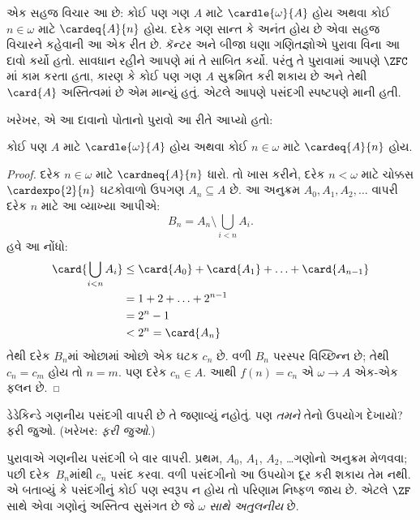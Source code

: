 \begin{ex}
એક સહજ વિચાર આ છે: કોઈ પણ ગણ $A$
માટે $\cardle{\omega}{A}$ હોય અથવા
કોઈ $n \in \omega$ માટે
$\cardeq{A}{n}$ હોય. દરેક ગણ સાન્ત કે
અનંત હોય છે એવા સહજ વિચારને કહેવાની
આ એક રીત છે. કૅન્ટર અને બીજા ઘણા
ગણિતજ્ઞોએ પુરાવા વિના આ દાવો કર્યો હતો.
સાવધાન રહીને આપણે
માં
તે સાબિત કર્યો. પરંતુ તે પુરાવામાં આપણે
$\ZFC$માં કામ કરતા હતા, કારણ કે કોઈ
પણ ગણ $A$ સુક્રમિત કરી શકાય છે અને
તેથી $\card{A}$ અસ્તિત્વમાં છે એમ માન્યું
હતું. એટલે આપણે પસંદગી સ્પષ્ટપણે માની હતી.

ખરેખર, \citet{Dedekind1888}એ આ દાવાનો
પોતાનો પુરાવો આ રીતે આપ્યો હતો:

\begin{thm}
કોઈ પણ $A$ માટે $\cardle{\omega}{A}$ હોય
અથવા કોઈ $n \in \omega$ માટે
$\cardeq{A}{n}$ હોય.
\end{thm}

\begin{proof}
દરેક $n \in \omega$ માટે
$\cardneq{A}{n}$ ધારો. તો ખાસ કરીને,
દરેક $n < \omega$ માટે ચોક્કસ
$\cardexpo{2}{n}$ ઘટકોવાળો ઉપગણ
$A_n \subseteq A$ છે. આ અનુક્રમ
$A_0, A_1, A_2, \ldots$ વાપરી દરેક
$n$ માટે આ વ્યાખ્યા આપીએ:
\[
	B_n = A_n \setminus \bigcup_{i < n} A_i.
\]
હવે આ નોંધો:
\begin{align*}
	\card{\bigcup_{i < n}A_i} 
	&\leq \card{A_0} + \card{A_1} + \ldots + \card{A_{n-1}}\\
	&=1 + 2 + \ldots + 2^{n-1}\\
	& = 2^n - 1\\
	& < 2^n = \card{A_n}
\end{align*}
તેથી દરેક $B_n$માં ઓછામાં ઓછો એક
ઘટક $c_n$ છે. વળી $B_n$ પરસ્પર
વિચ્છિન્ન છે; તેથી $c_n = c_m$ હોય
તો $n = m$. પણ દરેક $c_n \in A$.
આથી $f(n) = c_n$ એ
$\omega \to A$ એક-એક ફલન છે.
\end{proof}
\noindent
ડેડેકિન્ડે ગણનીય પસંદગી વાપરી છે તે
જણાવ્યું નહોતું. પણ \emph{તમને} તેનો
ઉપયોગ દેખાયો? ફરી જુઓ. (ખરેખર:
\emph{ફરી જુઓ}.)

પુરાવાએ ગણનીય પસંદગી બે વાર વાપરી.
પ્રથમ, $A_0$, $A_1$, $A_2$, \dots\@ ગણોનો
અનુક્રમ મેળવવા; પછી દરેક~$B_n$માંથી
$c_n$ પસંદ કરવા. વળી પસંદગીનો આ
ઉપયોગ દૂર કરી શકાય તેમ નથી.
\citet[p.~138]{Cohen1966}એ બતાવ્યું કે
પસંદગીનું કોઈ પણ સ્વરૂપ ન હોય તો પરિણામ
નિષ્ફળ જાય છે. એટલે $\ZF$ સાથે એવા
ગણોનું અસ્તિત્વ સુસંગત છે જે
\emph{$\omega$ સાથે અતુલનીય} છે.
\end{ex}

